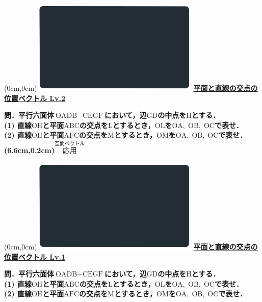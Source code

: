 \documentclass[10pt,
fleqn,
dvipdfmx,
uplatex
]{jsarticle}
\begin{document}
\at(0cm,0cm){\includegraphics[width=8cm,bb=0 0 1920 1080]{./youtube/thumbnails/templates/smart_background/空間ベクトル.jpeg}}
{\color{orange}\bf\boldmath\large\underline{平面と直線の交点の位置ベクトル Lv.2 }}\vspace{0.3zw}

\normalsize 
\bf\boldmath 問．平行六面体$\text{OADB}-\text{CEGF}$において，辺$\text{GD}$の中点を$\text{H}$とする．\\
(1)  直線$\text{OH}$と平面$\text{ABC}$の交点を$\text{L}$とするとき，$\text{OL}$を$\text{OA},\;\text{OB},\;\text{OC}$で表せ．\\
(2)  直線$\text{OH}$と平面$\text{AFC}$の交点を$\text{M}$とするとき，$\text{OM}$を$\text{OA},\;\text{OB},\;\text{OC}$で表せ．\\

\at(6.6cm,0.2cm){\small\color{bradorange}$\overset{\text{空間ベクトル}}{\text{応用}}$}


\newpage



\at(0cm,0cm){\includegraphics[width=8cm,bb=0 0 1920 1080]{./youtube/thumbnails/templates/smart_background/空間ベクトル.jpeg}}
{\color{orange}\bf\boldmath\large\underline{平面と直線の交点の位置ベクトル Lv.1 }}\vspace{0.3zw}

\normalsize 
\bf\boldmath 問．平行六面体$\text{OADB}-\text{CEGF}$において，辺$\text{GD}$の中点を$\text{H}$とする．\\
(1)  直線$\text{OH}$と平面$\text{ABC}$の交点を$\text{L}$とするとき，$\text{OL}$を$\text{OA},\;\text{OB},\;\text{OC}$で表せ．\\
(2)  直線$\text{OH}$と平面$\text{AFC}$の交点を$\text{M}$とするとき，$\text{OM}$を$\text{OA},\;\text{OB},\;\text{OC}$で表せ．\\
\end{document}

